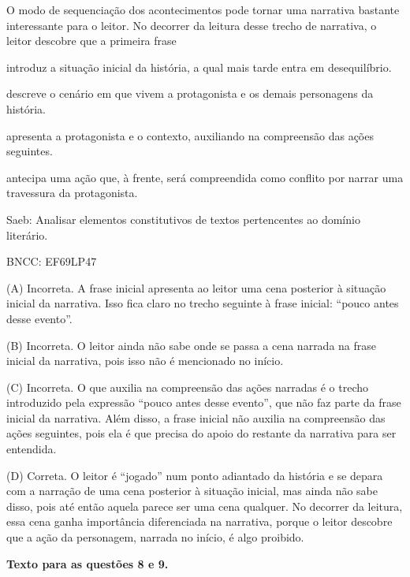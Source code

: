 
O modo de sequenciação dos acontecimentos pode tornar uma narrativa
bastante interessante para o leitor. No decorrer da leitura desse trecho
de narrativa, o leitor descobre que a primeira frase

\begin{escolha}
\item introduz a situação inicial da história, a qual mais tarde entra em
desequilíbrio.

\item descreve o cenário em que vivem a protagonista e os demais
personagens da história.

\item apresenta a protagonista e o contexto, auxiliando na compreensão das
ações seguintes.

\item antecipa uma ação que, à frente, será compreendida como conflito por
narrar uma travessura da protagonista.
\end{escolha}

Saeb: Analisar elementos constitutivos de textos pertencentes ao domínio
literário.

BNCC: EF69LP47

(A) Incorreta. A frase inicial apresenta ao leitor uma cena posterior à
situação inicial da narrativa. Isso fica claro no trecho seguinte à
frase inicial: ``pouco antes desse evento''.

(B) Incorreta. O leitor ainda não sabe onde se passa a cena narrada na
frase inicial da narrativa, pois isso não é mencionado no início.

(C) Incorreta. O que auxilia na compreensão das ações narradas é o
trecho introduzido pela expressão ``pouco antes desse evento'', que não
faz parte da frase inicial da narrativa. Além disso, a frase inicial não
auxilia na compreensão das ações seguintes, pois ela é que precisa do
apoio do restante da narrativa para ser entendida.

(D) Correta. O leitor é ``jogado'' num ponto adiantado da história e se
depara com a narração de uma cena posterior à situação inicial, mas
ainda não sabe disso, pois até então aquela parece ser uma cena
qualquer. No decorrer da leitura, essa cena ganha importância
diferenciada na narrativa, porque o leitor descobre que a ação da
personagem, narrada no início, é algo proibido.

\textbf{Texto para as questões 8 e 9.}

